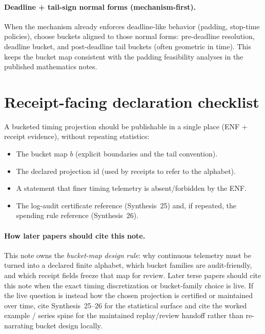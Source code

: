 \documentclass[11pt]{article}
\begin{document}
\paragraph{Deadline + tail-sign normal forms (mechanism-first).}
When the mechanism already enforces deadline-like behavior (padding, stop-time policies),
choose buckets aligned to those normal forms:
pre-deadline resolution, deadline bucket, and post-deadline tail buckets (often geometric in time).
This keeps the bucket map consistent with the padding feasibility analyses in the published mathematics notes. \cite{pub:stopnormal, pub:prefixcaps}

\section{Receipt-facing declaration checklist}
A bucketed timing projection should be publishable in a single place (ENF + receipt evidence), without repeating statistics:
\begin{itemize}[leftmargin=*]
\item The bucket map $b$ (explicit boundaries and the tail convention).
\item The declared projection id (used by receipts to refer to the alphabet).
\item A statement that finer timing telemetry is absent/forbidden by the ENF. \cite{series:traceifaces}
\item The log-audit certificate reference (Synthesis~25) and, if repeated, the spending rule reference (Synthesis~26). \cite{series:stataudit,series:anytimespend}
\end{itemize}

\paragraph{How later papers should cite this note.}
This note owns the \emph{bucket-map design rule}: why continuous telemetry must be turned into a declared finite alphabet, which bucket families are audit-friendly, and which receipt fields freeze that map for review. Later terse papers should cite this note when the exact timing discretization or bucket-family choice is live. If the live question is instead how the chosen projection is certified or maintained over time, cite Synthesis~25--26 for the statistical surface and cite the worked example / series spine for the maintained replay/review handoff rather than re-narrating bucket design locally.\cite{series:workedexample,series:seriesspines}
\end{document}
